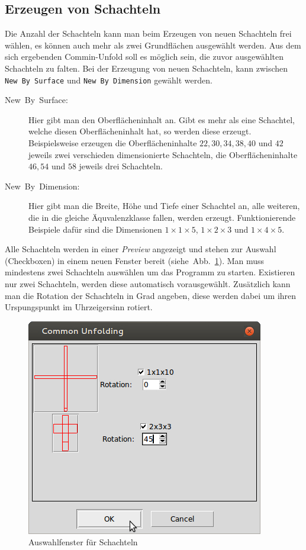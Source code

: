 \subsection{Erzeugen von Schachteln}
\label{subsec:schachteln}

Die Anzahl der Schachteln kann man beim Erzeugen von neuen Schachteln frei wählen, \dH es können auch mehr als zwei Grundflächen ausgewählt werden. Aus dem sich ergebenden Commin-Unfold soll es möglich sein, die zuvor ausgewählten Schachteln zu falten. Bei der Erzeugung von neuen Schachteln, kann zwischen \texttt{New By Surface} und \texttt{New By Dimension} gewählt werden.

  \begin{description}
    \item [{New~By~Surface:}] Hier gibt man den Oberflächeninhalt an. Gibt es mehr als eine Schachtel, welche diesen Oberflächeninhalt hat, so werden diese erzeugt. Beispielsweise erzeugen die Oberflächeninhalte $22, 30, 34, 38, 40$ und $42$ jeweils zwei verschieden dimensionierte Schachteln, die Oberflächeninhalte $46, 54$ und $58$ jeweils drei Schachteln.
    \item [{New~By~Dimension:}] Hier gibt man die Breite, Höhe und Tiefe einer Schachtel an, alle weiteren, die in die gleiche Äquvalenzklasse fallen, werden erzeugt. Funktionierende Beispiele dafür sind die Dimensionen $1\times1\times5$, $1\times2\times3$ und $1\times4\times5$.
  \end{description}

Alle Schachteln werden in einer \emph{Preview} angezeigt und stehen zur Auswahl (Checkboxen) in einem neuen Fenster bereit (siehe~Abb.~\ref{fig:preview}). Man muss mindestens zwei Schachteln auswählen um das Programm zu starten. Existieren nur zwei Schachteln, werden diese automatisch vorausgewählt. Zusätzlich kann man die Rotation der Schachteln in Grad angeben, diese werden dabei um ihren Urspungspunkt im Uhrzeigersinn rotiert.

\begin{figure}[htbp]
  \centering
  \includegraphics[scale=0.5]{03_pics/auswahl.jpg}
  \caption{Auswahlfenster für Schachteln}
  \label{fig:preview}
\end{figure}



